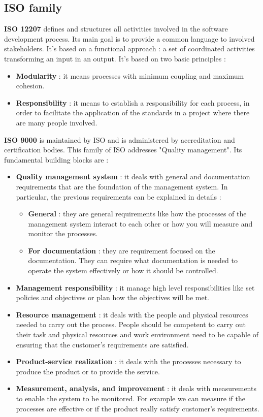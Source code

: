 \subsection{ISO family}
\textbf{ISO 12207} defines and structures all activities involved in the software development process. Its main goal is to provide a common language to involved stakeholders. It's based on a functional approach : a set of coordinated activities transforming an input in an output. It's based on two basic principles :
\begin{itemize}
    \item \textbf{Modularity} : it means processes with minimum coupling and maximum cohesion.
    \item \textbf{Responsibility} : it means to establish a responsibility for each process, in order to facilitate the application of the standards in a project where there are many people involved.
\end{itemize}
\textbf{ISO 9000} is maintained by ISO and is administered by accreditation and certification bodies. This family of ISO addresses "Quality management". Its fundamental building blocks are :
\begin{itemize}
    \item \textbf{Quality management system} : it deals with general and documentation requirements that are the foundation of the management system. In particular, the previous requirements can be explained in details :
          \begin{itemize}
              \item \textbf{General} : they are general requirements like how the processes of the management system interact to each other or how you will measure and monitor the processes.
              \item \textbf{For documentation} : they are requirement focused on the documentation. They can require what documentation is needed to operate the system effectively or how it should be controlled.
          \end{itemize}
    \item \textbf{Management responsibility} : it manage high level responsibilities like set policies and objectives or plan how the objectives will be met.
    \item \textbf{Resource management} : it deals with the people and physical resources needed to carry out the process. People should be competent to carry out their task and physical resources and work environment need to be capable of ensuring that the customer's requirements are satisfied.
    \item \textbf{Product-service realization} : it deals with the processes necessary to produce the product or to provide the service.
    \item \textbf{Measurement, analysis, and improvement} : it deals with measurements to enable the system to be monitored. For example we can measure if the processes are effective or if the product really satisfy customer's requirements.
\end{itemize}
